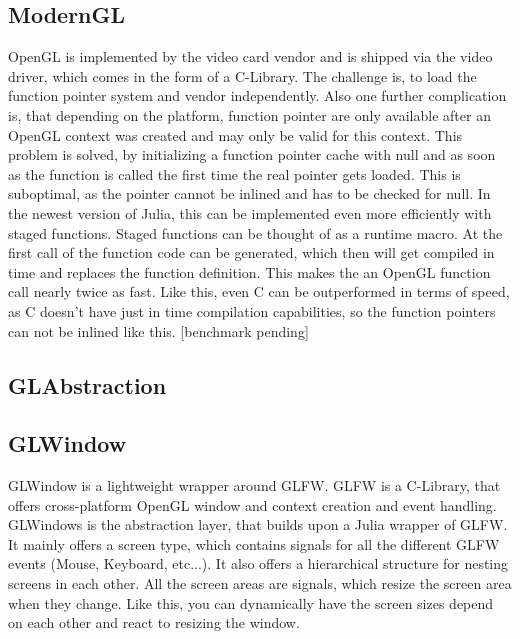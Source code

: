 \subsection{ModernGL}
OpenGL is implemented by the video card vendor and is shipped via the video driver, which comes in the form of a C-Library.
The challenge is, to load the function pointer system and vendor independently. Also one further complication is, that depending on the platform, function pointer are only available after an OpenGL context was created and may only be valid for this context. \cite{wgl}
This problem is solved, by initializing a function pointer cache with null and as soon as the function is called the first time the real pointer gets loaded. This is suboptimal, as the pointer cannot be inlined and has to be checked for null.
In the newest version of Julia, this can be implemented even more efficiently with staged functions. Staged functions can be thought of as a runtime macro.
At the first call of the function code can be generated, which then will get compiled in time and replaces the function definition. 
This makes the an OpenGL function call nearly twice as fast.
Like this, even C can be outperformed in terms of speed, as C doesn't have just in time compilation capabilities, so the function pointers can not be inlined like this. [benchmark pending]


\subsection{GLAbstraction}


\subsection{GLWindow}
GLWindow is a lightweight wrapper around GLFW. GLFW is a C-Library, that offers cross-platform OpenGL window and context creation and event handling.
GLWindows is the abstraction layer, that builds upon a Julia wrapper of GLFW.
It mainly offers a screen type, which contains signals for all the different GLFW events (Mouse, Keyboard, etc...). 
It also offers a hierarchical structure for nesting screens in each other. 
All the screen areas are signals, which resize the screen area when they change. Like this, you can dynamically have the screen sizes depend on each other and react to resizing the window.



